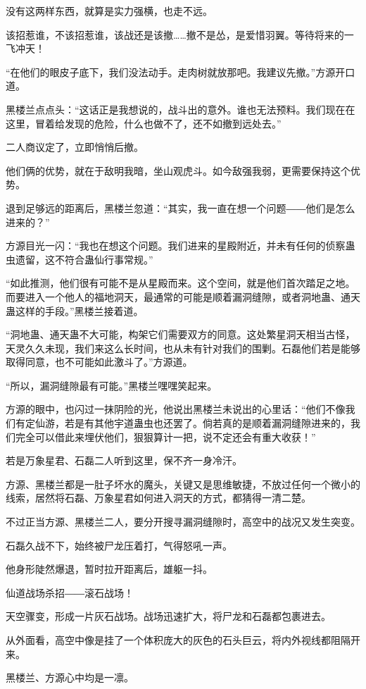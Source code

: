 \begin{this_body}
没有这两样东西，就算是实力强横，也走不远。

该招惹谁，不该招惹谁，该战还是该撤……撤不是怂，是爱惜羽翼。等待将来的一飞冲天！

“在他们的眼皮子底下，我们没法动手。走肉树就放那吧。我建议先撤。”方源开口道。

黑楼兰点点头：“这话正是我想说的，战斗出的意外。谁也无法预料。我们现在在这里，冒着给发现的危险，什么也做不了，还不如撤到远处去。”

二人商议定了，立即悄悄后撤。

他们俩的优势，就在于敌明我暗，坐山观虎斗。如今敌强我弱，更需要保持这个优势。

退到足够远的距离后，黑楼兰忽道：“其实，我一直在想一个问题――他们是怎么进来的？”

方源目光一闪：“我也在想这个问题。我们进来的星殿附近，并未有任何的侦察蛊虫遗留，这不符合蛊仙行事常规。”

“如此推测，他们很有可能不是从星殿而来。这个空间，就是他们首次踏足之地。而要进入一个他人的福地洞天，最通常的可能是顺着漏洞缝隙，或者洞地蛊、通天蛊这样的手段。”黑楼兰接着道。

“洞地蛊、通天蛊不大可能，构架它们需要双方的同意。这处繁星洞天相当古怪，天灵久久未现，我们来这么长时间，也从未有针对我们的围剿。石磊他们若是能够取得同意，也不可能如此激斗了。”方源道。

“所以，漏洞缝隙最有可能。”黑楼兰嘿嘿笑起来。

方源的眼中，也闪过一抹阴险的光，他说出黑楼兰未说出的心里话：“他们不像我们有定仙游，若是有其他宇道蛊虫也还罢了。倘若真的是顺着漏洞缝隙进来的，我们完全可以借此来埋伏他们，狠狠算计一把，说不定还会有重大收获！”

若是万象星君、石磊二人听到这里，保不齐一身冷汗。

方源、黑楼兰都是一肚子坏水的魔头，关键又是思维敏捷，不放过任何一个微小的线索，居然将石磊、万象星君如何进入洞天的方式，都猜得一清二楚。

不过正当方源、黑楼兰二人，要分开搜寻漏洞缝隙时，高空中的战况又发生突变。

石磊久战不下，始终被尸龙压着打，气得怒吼一声。

他身形陡然爆退，暂时拉开距离后，雄躯一抖。

仙道战场杀招――滚石战场！

天空骤变，形成一片灰石战场。战场迅速扩大，将尸龙和石磊都包裹进去。

从外面看，高空中像是挂了一个体积庞大的灰色的石头巨云，将内外视线都阻隔开来。

黑楼兰、方源心中均是一凛。


\end{this_body}
